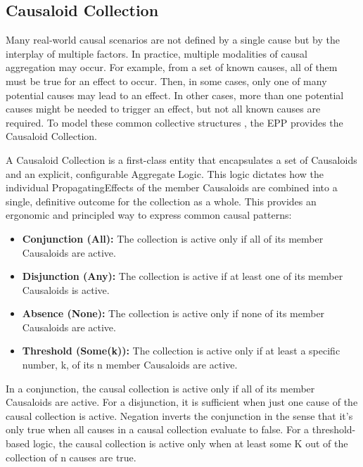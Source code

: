 %
%
\subsection{Causaloid Collection}
\label{sec:epp_causaloid_collection}


Many real-world causal scenarios are not defined by a single cause but by the interplay of multiple factors. In practice, multiple modalities of causal aggregation may occur. For example, from a set of known causes, all of them must be true for an effect to occur. Then, in some cases, only one of many potential causes may lead to an effect. In other cases, more than one potential causes might be needed to trigger an effect, but not all known causes are required. To model these common collective structures , the EPP provides the Causaloid Collection.

A Causaloid Collection is a first-class entity that encapsulates a set of Causaloids and an explicit, configurable Aggregate Logic. This logic dictates how the individual PropagatingEffects of the member Causaloids are combined into a single, definitive outcome for the collection as a whole. This provides an ergonomic and principled way to express common causal patterns:

\begin{itemize}
\item \textbf{Conjunction (All):} The collection is active only if all of its member Causaloids are active.
\item \textbf{Disjunction (Any):} The collection is active if at least one of its member Causaloids is active.
\item \textbf{Absence (None):} The collection is active only if none of its member Causaloids are active.
\item \textbf{Threshold (Some(k)):} The collection is active only if at least a specific number, k, of its n member Causaloids are active.
\end{itemize}

In a conjunction, the causal collection is active only if all of its member Causaloids are active. For a disjunction, it is sufficient when just one cause of the causal collection is active. Negation inverts the conjunction in the sense that it's only true when all causes in a causal collection evaluate to false. For a threshold-based logic, the causal collection is active only when at least some K out of the collection of n causes are true. 

